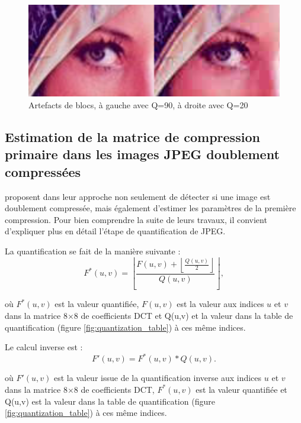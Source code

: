 \documentclass[utf8,final]{stageM2R} %
\begin{document}
\begin{figure}[H]
  \begin{center}
    \includegraphics[width=120mm]{images/eyes.png}
    \caption{Artefacts de blocs, à gauche avec Q=90, à droite avec Q=20}
    \label{fig:blocs_artefacts}
  \end{center}
\end{figure}


\subsection{Estimation de la matrice de compression primaire dans les images JPEG doublement compressées}
\label{estimation_matrice_compression}
 \autocite{lukavs2003estimation} proposent dans leur approche non seulement de détecter si une image est doublement compressée, mais également d'estimer les paramètres de la première compression. Pour bien comprendre la suite de leurs travaux, il convient d'expliquer plus en détail l'étape de quantification de JPEG.

La quantification se fait de la manière suivante :
\begin{equation}
  F^*(u,v) = \left \lfloor \frac{F(u,v) + \left \lfloor \frac{Q(u,v)}{2} \right \rfloor }{Q(u,v)} \right \rfloor,
  \label{eqn:quantization}
\end{equation}

où $F^*(u,v)$ est la valeur quantifiée, $F(u,v)$ est la valeur aux indices $u$ et $v$ dans la matrice 8$\times$8 de coefficients DCT et Q(u,v) et la valeur dans la table de quantification (figure \ref{fig:quantization_table}) à ces même indices.

Le calcul inverse est :
\begin{equation}
  F'(u,v) = F^*(u,v) * Q(u,v).
  \label{eqn:iquantization}
\end{equation}

où $F'(u,v)$ est la valeur issue de la quantification inverse aux indices $u$ et $v$ dans la matrice 8$\times$8 de coefficients DCT, $F^*(u,v)$ est la valeur quantifiée et Q(u,v) est la valeur dans la table de quantification (figure \ref{fig:quantization_table}) à ces même indices.
\end{document}
